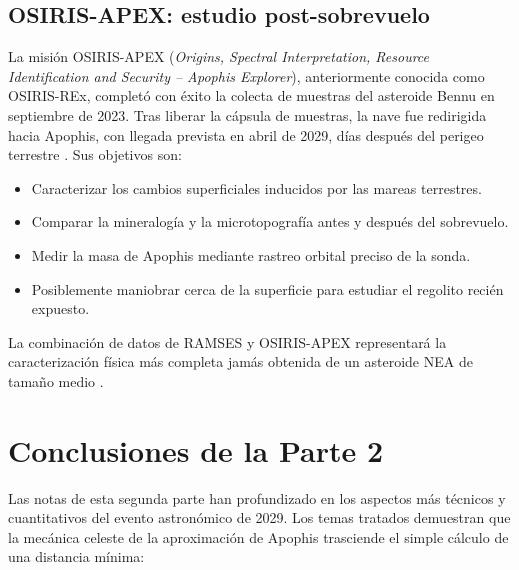 \documentclass[a4paper]{article}
\begin{document}
\subsection{OSIRIS-APEX: estudio post-sobrevuelo}

La misión OSIRIS-APEX (\textit{Origins, Spectral Interpretation, Resource Identification and Security – Apophis Explorer}), anteriormente conocida como OSIRIS-REx, completó con éxito la colecta de muestras del asteroide Bennu en septiembre de 2023. Tras liberar la cápsula de muestras, la nave fue redirigida hacia Apophis, con llegada prevista en abril de 2029, días después del perigeo terrestre \cite{esa2024apophis}. Sus objetivos son:
\begin{itemize}
  \item Caracterizar los cambios superficiales inducidos por las mareas terrestres.
  \item Comparar la mineralogía y la microtopografía antes y después del sobrevuelo.
  \item Medir la masa de Apophis mediante rastreo orbital preciso de la sonda.
  \item Posiblemente maniobrar cerca de la superficie para estudiar el regolito recién expuesto.
\end{itemize}

La combinación de datos de RAMSES y OSIRIS-APEX representará la caracterización física más completa jamás obtenida de un asteroide NEA de tamaño medio \cite{esa2024apophis, esa2024ramses}.

\section{Conclusiones de la Parte 2}

Las notas de esta segunda parte han profundizado en los aspectos más técnicos y cuantitativos del evento astronómico de 2029. Los temas tratados demuestran que la mecánica celeste de la aproximación de Apophis trasciende el simple cálculo de una distancia mínima:
\end{document}
